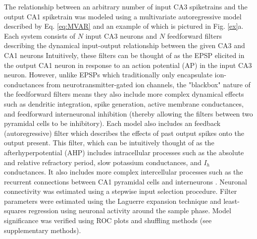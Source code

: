 \documentclass[11pt,a4paper,final]{article}
\begin{document}
The relationship between an arbitrary number of input CA3 spiketrains and the output CA1 spiketrain was modeled using a multivariate autoregressive model described by Eq. \ref{eq:MVAR} and an example of which is pictured in Fig. \ref{ex}a.
Each system consists of $N$ input CA3 neurons and $N$ feedforward filters describing the dynamical input-output relationship between the given CA3 and CA1 neurons %
Intuitively, these filters can be thought of as the EPSP elicited in the output CA1 neuron in response to an action potential (AP) in the input CA3 neuron.
However, unlike EPSPs which traditionally only encapsulate ion-conductances from neurotransmitter-gated ion channels, the "blackbox" nature of the feedforward filters means they also include more complex dynamical effects such as dendritic integration, spike generation, active membrane conductances, and feedforward interneuronal inhibition (thereby allowing the filters between two pyramidal cells to be inhibitory).
Each model also includes an feedback (autoregressive) filter which describes the effects of past output spikes onto the output present.
This filter, which can be intuitively thought of as the afterhyperpotential (AHP) \citep{spruston07} includes intracellular processes such as the absolute and relative refractory period, slow potassium conductances, and $I_h$ conductances.
It also includes more complex intercellular processes such as the recurrent connections between CA1 pyramidal cells and interneurons \citep{klausberger08}.
Neuronal connectivity was estimated using a stepwise input selection procedure.
Filter parameters were estimated using the Laguerre expansion technique and least-squares regression using neuronal activity around the sample phase.
Model significance was verified using ROC plots and shuffling methods (see supplementary methods).
\end{document}
